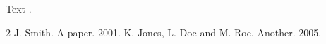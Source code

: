 \documentclass{article}
\begin{document}
Text \citep{a,b}.
\begin{thebibliography}{2}
 J. Smith. A paper. 2001.
 K. Jones, L. Doe and M. Roe. Another. 2005.
\end{thebibliography}
\end{document}
